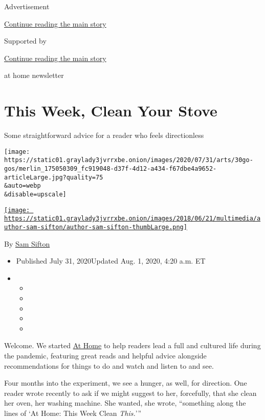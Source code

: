 Advertisement

\protect\hyperlink{after-top}{Continue reading the main story}

Supported by

\protect\hyperlink{after-sponsor}{Continue reading the main story}

at home newsletter

\hypertarget{this-week-clean-your-stove}{%
\section{This Week, Clean Your Stove}\label{this-week-clean-your-stove}}

Some straightforward advice for a reader who feels directionless

\texttt{[image: https://static01.graylady3jvrrxbe.onion/images/2020/07/31/arts/30go-gos/merlin\_175050309\_fc919048-d37f-4d12-a434-f67dbe4a9652-articleLarge.jpg?quality=75\\\&auto=webp\\\&disable=upscale]}

\href{https://www.nytimes3xbfgragh.onion/by/sam-sifton}{\texttt{[image: https://static01.graylady3jvrrxbe.onion/images/2018/06/21/multimedia/author-sam-sifton/author-sam-sifton-thumbLarge.png]}}

By \href{https://www.nytimes3xbfgragh.onion/by/sam-sifton}{Sam Sifton}

\begin{itemize}
\item
  Published July 31, 2020Updated Aug. 1, 2020, 4:20 a.m. ET
\item
  \begin{itemize}
  \item
  \item
  \item
  \item
  \item
  \end{itemize}
\end{itemize}

Welcome. We started
\href{https://www.nytimes3xbfgragh.onion/spotlight/at-home}{At Home} to
help readers lead a full and cultured life during the pandemic,
featuring great reads and helpful advice alongside recommendations for
things to do and watch and listen to and see.

Four months into the experiment, we see a hunger, as well, for
direction. One reader wrote recently to ask if we might suggest to her,
forcefully, that she clean her oven, her washing machine. She wanted,
she wrote, ``something along the lines of `At Home: This Week Clean
\emph{This.}'''

